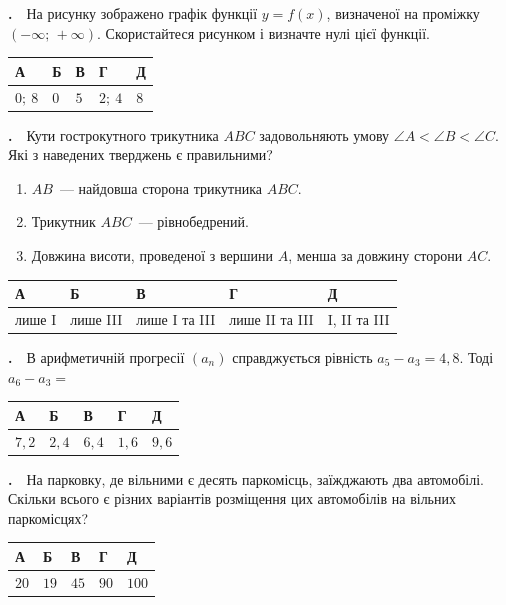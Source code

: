 \documentclass[12pt]{article}
\newcommand{\answerTable}[5]{%
\par\vspace{0.15cm}
\noindent
\begin{tabular}{|*{5}{>{\centering\arraybackslash}m{3cm}|}}
\hline
\rule[-0.15cm]{0pt}{0.6cm}\textbf{А} & \rule[-0.15cm]{0pt}{0.6cm}\textbf{Б} & \rule[-0.15cm]{0pt}{0.6cm}\textbf{В} & \rule[-0.15cm]{0pt}{0.6cm}\textbf{Г} & \rule[-0.15cm]{0pt}{0.6cm}\textbf{Д} \\
\hline
\rule[-0.2cm]{0pt}{0.75cm}#1 & \rule[-0.2cm]{0pt}{0.75cm}#2 & \rule[-0.2cm]{0pt}{0.75cm}#3 & \rule[-0.2cm]{0pt}{0.75cm}#4 & \rule[-0.2cm]{0pt}{0.75cm}#5 \\
\hline
\end{tabular}
\par\vspace{0.25cm}
}
\newcounter{zad}
\newcommand{\zadtask}[1]{\stepcounter{zad}\par\vspace{0.3cm}\noindent\textbf{\thezad.}\ \ #1\par\vspace{0.2cm}}
\newcommand{\zadnum}{\stepcounter{zad}\noindent\textbf{\thezad.}\ \ }
\begin{document}
\noindent
\begin{minipage}[c]{0.56\textwidth}
\zadnum На рисунку зображено графік функції $y=f(x)$, визначеної на проміжку $(-\infty;\, +\infty)$. Скористайтеся рисунком і визначте нулі цієї функції.
\end{minipage}%
\hfill
\begin{minipage}[c]{0.42\textwidth}
\centering
{}
\end{minipage}
\par\vspace{0.2cm}
\answerTable{$0;\ 8$}{$0$}{$5$}{$2;\ 4$}{$8$}

\zadtask{Кути гострокутного трикутника $ABC$ задовольняють умову $\angle A < \angle B < \angle C$. Які з наведених тверджень є правильними?
\vspace{0.1cm}
\begin{enumerate}[label=\textbf{\Roman*.}, leftmargin=2.8em, itemsep=0.1cm]
\item $AB$~--- найдовша сторона трикутника $ABC$.
\item Трикутник $ABC$~--- рівнобедрений.
\item Довжина висоти, проведеної з вершини $A$, менша за довжину сторони $AC$.
\end{enumerate}
\vspace{0.1cm}}
\answerTable{лише I}{лише III}{лише I та III}{лише II та III}{I, II та III}

\zadtask{В арифметичній прогресії $(a_n)$ справджується рівність $a_5 - a_3 = 4{,}8$. Тоді $a_6 - a_3 =$}
\answerTable{$7{,}2$}{$2{,}4$}{$6{,}4$}{$1{,}6$}{$9{,}6$}

\zadtask{На парковку, де вільними є десять паркомісць, заїжджають два автомобілі. Скільки всього є різних варіантів розміщення цих автомобілів на вільних паркомісцях?}
\answerTable{$20$}{$19$}{$45$}{$90$}{$100$}
\end{document}
